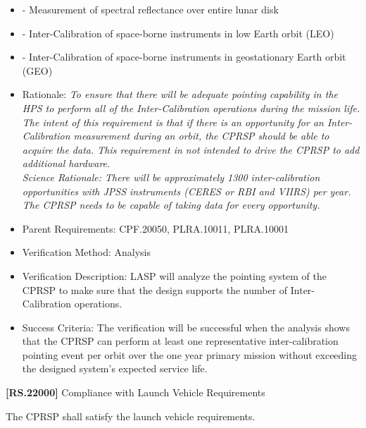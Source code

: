 \begin{itemize}
\item{} - Measurement of spectral reflectance over entire lunar disk

\item{} - Inter-Calibration of space-borne instruments in low Earth orbit (LEO)

\item{} - Inter-Calibration of space-borne instruments in geostationary Earth orbit (GEO)

\item{} Rationale: \emph{To ensure that there will be adequate pointing capability in the HPS to perform all of the Inter-Calibration operations during the mission life. The intent of this requirement is that if there is an opportunity for an Inter-Calibration measurement during an orbit, the CPRSP should be able to acquire the data. This requirement in not intended to drive the CPRSP to add additional hardware.\\
Science Rationale: There will be approximately 1300 inter-calibration opportunities with JPSS instruments (CERES or RBI and VIIRS) per year. The CPRSP needs to be capable of taking data for every opportunity.}

\item{} Parent Requirements: \gls{CPF}.20050, PLRA.10011, PLRA.10001

\item{} Verification Method: Analysis

\item{} Verification Description: \gls{LASP} will analyze the \gls{point}ing system of the \gls{CPRSP} to make sure that the design supports the number of Inter-Calibration operations.

\item{} Success Criteria: The verification will be successful when the \gls{analysis} shows that the \gls{CPRSP} can perform at least one representative inter-calibration \gls{point}ing event per orbit over the one year primary mission without exceeding the designed system's expected service life.

\end{itemize}

\textbf{[RS.22000]} Compliance with Launch Vehicle Requirements

The \gls{CPRSP} shall satisfy the launch vehicle requirements.

